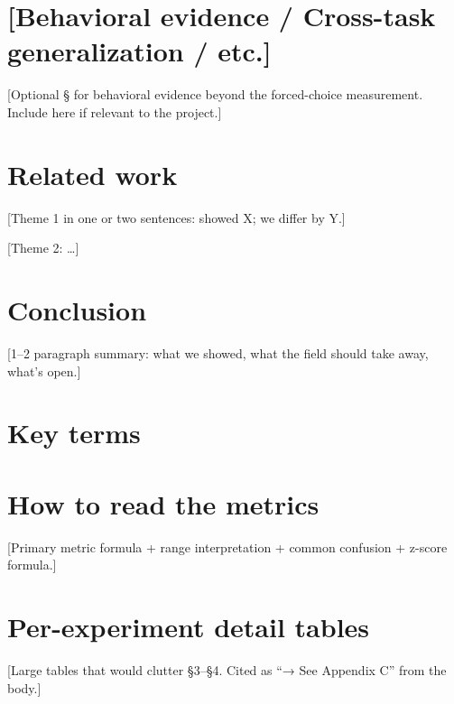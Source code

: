 \documentclass[11pt, letterpaper]{article}
\begin{document}
\section{[Behavioral evidence / Cross-task generalization / etc.]}
\label{sec:behavioral}

[Optional § for behavioral evidence beyond the forced-choice measurement.
Include here if relevant to the project.]

\section{Related work}
\label{sec:related}

[Theme 1 in one or two sentences: \citet{example2024} showed X; we differ by Y.]

[Theme 2: \citet{example2025} \ldots]

\section{Conclusion}

[1--2 paragraph summary: what we showed, what the field should take
away, what's open.]

\FloatBarrier   %




\appendix
\newpage
\section{Key terms}
\label{app:terms}
\begin{description}[leftmargin=*, itemsep=1pt]
\item[Term 1] [Definition + how it's measured.]
\item[Term 2] [Definition.]
\end{description}

\section{How to read the metrics}
\label{app:metric}
[Primary metric formula + range interpretation + common confusion + z-score formula.]

\section{Per-experiment detail tables}
\label{app:detail}
[Large tables that would clutter §3--§4. Cited as ``→ See Appendix C'' from the body.]
\end{document}
